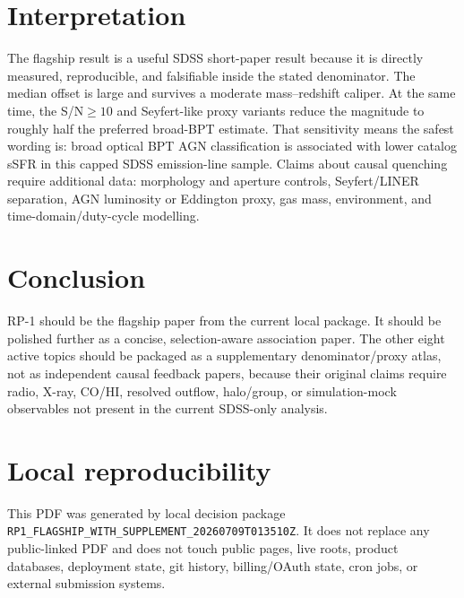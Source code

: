 \documentclass[twocolumn]{aastex631}
\begin{document}
\section{Interpretation}
The flagship result is a useful SDSS short-paper result because it is directly measured, reproducible, and falsifiable inside the stated denominator. The median offset is large and survives a moderate mass--redshift caliper. At the same time, the S/N$\geq10$ and Seyfert-like proxy variants reduce the magnitude to roughly half the preferred broad-BPT estimate. That sensitivity means the safest wording is: broad optical BPT AGN classification is associated with lower catalog sSFR in this capped SDSS emission-line sample. Claims about causal quenching require additional data: morphology and aperture controls, Seyfert/LINER separation, AGN luminosity or Eddington proxy, gas mass, environment, and time-domain/duty-cycle modelling.

\section{Conclusion}
RP-1 should be the flagship paper from the current local package. It should be polished further as a concise, selection-aware association paper. The other eight active topics should be packaged as a supplementary denominator/proxy atlas, not as independent causal feedback papers, because their original claims require radio, X-ray, CO/HI, resolved outflow, halo/group, or simulation-mock observables not present in the current SDSS-only analysis.

\section{Local reproducibility}
This PDF was generated by local decision package \texttt{RP1\_FLAGSHIP\_WITH\_SUPPLEMENT\_20260709T013510Z}. It does not replace any public-linked PDF and does not touch public pages, live roots, product databases, deployment state, git history, billing/OAuth state, cron jobs, or external submission systems.
\end{document}
